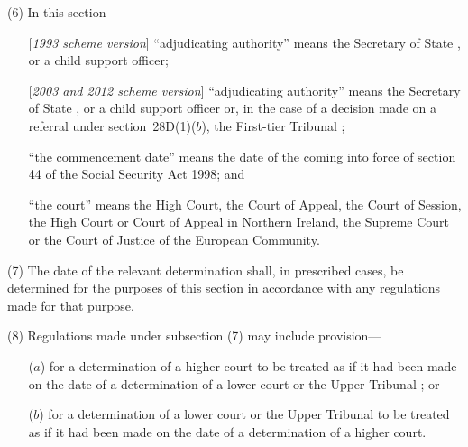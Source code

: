 \documentclass[12pt,a4paper]{article}
\begin{document}
(6) In this section—
\begin{enumerate}\item[]
    [\emph{1993 scheme version}] “adjudicating authority” means the 
Secretary of State%
, or a child support officer;

    [\emph{2003 and 2012 scheme version}] “adjudicating authority” means the 
Secretary of State%
, or a child support officer
or, in the case of a decision made on a referral under section~28D(1)($b$), 
the First-tier Tribunal%
;

    “the commencement date” means the date of the coming into force of section 44 of the Social Security Act 1998; and

    “the court” means the High Court, the Court of Appeal, the Court of Session, the High Court or Court of Appeal in Northern Ireland, the 
Supreme Court  %
or the Court of Justice of the European Community. 
\end{enumerate}

(7) The date of the relevant determination shall, in prescribed cases, be determined for the purposes of this section in accordance with any regulations made for that purpose.

(8) Regulations made under subsection (7) may include provision—
\begin{enumerate}\item[]
($a$) for a determination of a higher court to be treated as if it had been made on the date of a determination of a lower court or 
the Upper Tribunal%
; or

($b$) for a determination of a lower court or 
the Upper Tribunal   %
to be treated as if it had been made on the date of a determination of a higher court.
\end{enumerate}
\end{document}
